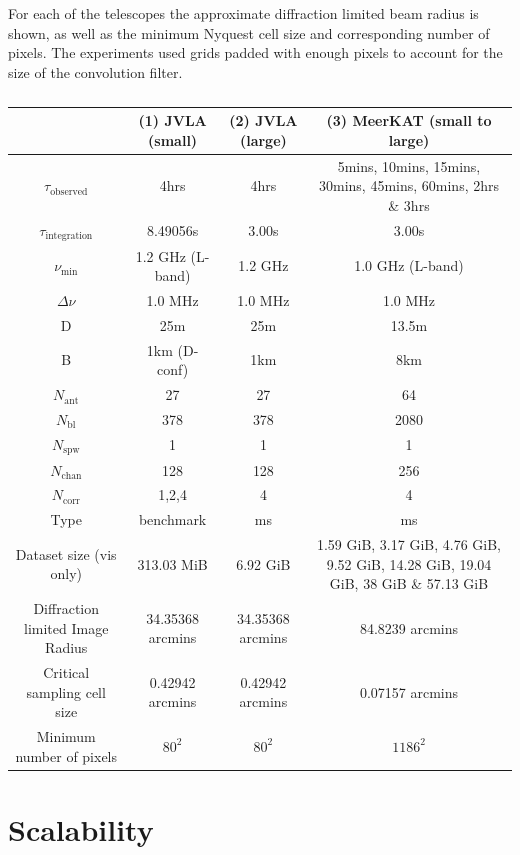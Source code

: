 For each of the telescopes the approximate diffraction limited beam radius is shown, as well as the minimum Nyquest cell size and corresponding number of pixels. The experiments used grids padded
with enough pixels to account for the size of the convolution filter.
\begin{table}[ht]
  \centering
  \begin{tabular}[c]{|c||c|c|c|}
  \hline
  & (1) JVLA (small) & (2) JVLA (large) & (3) MeerKAT (small to large)\\
  \hline
  $\tau_\text{observed}$ & 4hrs & 4hrs & \multicolumn{1}{m{4cm}|}{5mins, 10mins, 15mins, 30mins, 45mins, 60mins, 2hrs \& 3hrs}\\
  \hline
  $\tau_\text{integration}$ & 8.49056s & 3.00s & 3.00s\\
  \hline
  $\nu_\text{min}$ & 1.2 GHz (L-band) & 1.2 GHz & 1.0 GHz (L-band)\\
  \hline
  $\Delta{\nu}$ & 1.0 MHz & 1.0 MHz & 1.0 MHz\\
  \hline
  D & 25m & 25m & 13.5m\\
  \hline
  B & 1km (D-conf) & 1km & 8km\\
  \hline
  $N_\text{ant}$ & 27 & 27 & 64\\
  \hline
  $N_\text{bl}$ & 378 & 378 & 2080\\
  \hline
  $N_\text{spw}$ & 1 & 1 & 1\\
  \hline
  $N_\text{chan}$ & 128 & 128 & 256\\
  \hline
  $N_\text{corr}$ & 1,2,4 & 4 & 4\\
  \hline
  Type & benchmark & ms & ms\\
  \hline
  Dataset size (vis only) & 313.03 MiB & 6.92 GiB & \multicolumn{1}{m{4cm}|}{1.59 GiB, 3.17 GiB, 4.76 GiB, 9.52 GiB, 14.28 GiB, 19.04 GiB, 38 GiB \& 57.13 GiB} \\
  \hline
  Diffraction limited Image Radius & 34.35368 arcmins & 34.35368 arcmins & 84.8239 arcmins\\
  \hline
  Critical sampling cell size & 0.42942 arcmins & 0.42942 arcmins & 0.07157 arcmins\\
  \hline
  Minimum number of pixels & $80^2$ & $80^2$ & $1186^2$\\
  \hline
  \end{tabular}
  \caption[]{}
  \label{tbl_datasets}
\end{table}
\section{Scalability}
